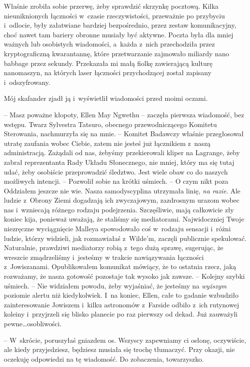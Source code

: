 \documentclass[oneside,polish,11pt,sfheadings]{mwbk}
\begin{document}
Właśnie zrobiła sobie przerwę, żeby sprawdzić skrzynkę pocztową. Kilka
nieuniknionych łączności w~czasie rzeczywistości, przeważnie po
przybyciu i~odlocie, były załatwiane bardziej bezpośrednio, przez zestaw
komunikacyjny, choć nawet tam bariery obronne musiały być aktywne.
Poczta była dla mniej ważnych lub osobistych wiadomości, a~każda z~nich
przechodziła przez kryptograficzną kwarantannę, które przetwarzanie
zajmowało miliardy nano babbage przez sekundy. Przekazała mi małą fiolkę
zawierającą kulturę nanomaszyn, na których laser łączności przychodzącej
został zapisany i~odszyfrowany.

Mój skafander zjadł ją i~wyświetlił wiadomości przed moimi oczami.

-- Masz poważne kłopoty, Ellen May Ngwethu -- zaczęła pierwsza wiadomość,
bez wstępu. Twarz Sylvestra Tatsuro, obecnego przewodniczącego Komitetu
Sterowania, nachmurzyła się na mnie. -- Komitet Badawczy właśnie
przegłosował utratę zaufania wobec Ciebie, zatem nie jesteś już
łącznikiem z~naszą administracją. Zażądali od nas, żebyśmy przekierowali
kliper na Lagrange, żeby zabrał reprezentanta Rady Układu Słonecznego,
nie mniej, który ma się tutaj udać, żeby osobiście przeprowadzić
śledztwo. Jest wiele obaw co do naszych możliwych intencji. -- Pozwolił
sobie na krótki uśmiech. -- O czym nikt poza Oddziałem jeszcze nie wie.
Nasza samodyscyplina utrzymała linię, \textit{na razie}. Ale ludzie z~Obrony Ziemi dogadzają ich zwyczajowym, zazdrosnym urazom wobec nas i~wzniecają różnego rodzaju podejrzenia. Szczęśliwie, mają całkowicie zły
koniec kija, ponieważ uważają, że staliśmy się mediatorami.
Najwidoczniej Twoje niezręczne wyciągnięcie Malleya spowodowało coś w~rodzaju sensacji i~różni ludzie, którzy widzieli, jak rozmawiałaś z~Wilde'm, zaczęli publicznie spekulować. Naturalnie, prawdziwi mediatorzy
robią z~tego dużą sprawę, sugerując, że wreszcie zmądrzeliśmy i~jesteśmy
w trakcie nawiązywania łączności z~Jowiszanami. Opublikowałem komunikat
mówiący, że to ostatnia rzecz, jaką rozważamy, że nasza gotowość
pozostaje tak wysoko jak zawsze. -- Kolejny szybki uśmiech. -- Nie
widziałem powodu, żeby wyjaśniać, że jesteśmy na \textit{wyższym }poziomie
alertu niż kiedykolwiek. I~na koniec, Ellen, całe to gadanie wzbudziło
zainteresowanie Jowiszem i~kilku astronomów z~Farside odbiło z~ich
rutynowej koleiny i~przyjrzeli się blisko planecie po raz pierwszy od
dekad. Już zauważyli pewne\ldots  osobliwości.

-- W~skrócie, poruszyłaś gniazdem os. Wszyscy zapewniamy ci osłonę,
oczywiście, ale kiedy przyjedziesz, będziesz musiała się trochę
tłumaczyć. Przy okazji, nie oczekuję odpowiedzi na tę wiadomość. Do
zobaczenia, towarzyszko.
\end{document}
